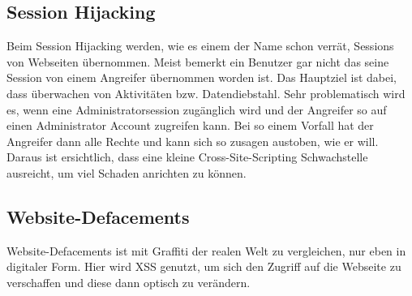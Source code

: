 \subsection{Session Hijacking}
\label{sec:xss_session_hijacking}
Beim Session Hijacking werden, wie es einem der Name schon verrät, Sessions von Webseiten übernommen. Meist bemerkt ein Benutzer gar nicht das seine Session von einem Angreifer übernommen worden ist. Das Hauptziel ist dabei, dass überwachen von Aktivitäten bzw. Datendiebstahl. Sehr problematisch wird es, wenn eine Administratorsession zugänglich wird und der Angreifer so auf einen Administrator Account zugreifen kann. Bei so einem Vorfall hat der Angreifer dann alle Rechte und kann sich so zusagen austoben, wie er will. Daraus ist ersichtlich, dass eine kleine Cross-Site-Scripting Schwachstelle ausreicht, um viel Schaden anrichten zu können. 
\subsection{Website-Defacements}
\label{sec:xss_web_def}
Website-Defacements ist mit Graffiti der realen Welt zu vergleichen, nur eben in digitaler Form. Hier wird XSS genutzt, um sich den Zugriff auf die Webseite zu verschaffen und diese dann optisch zu verändern. 

